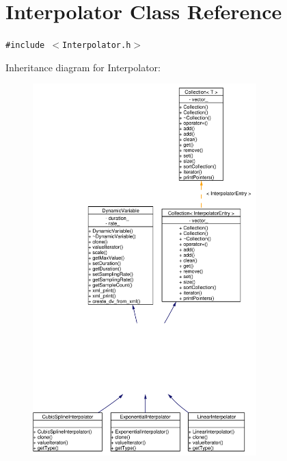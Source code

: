 \hypertarget{classInterpolator}{
\section{Interpolator Class Reference}
\label{classInterpolator}
}
{\tt \#include $<$Interpolator.h$>$}

Inheritance diagram for Interpolator:\begin{figure}[H]
\begin{center}
\leavevmode
\includegraphics[width=245pt]{classInterpolator__inherit__graph}
\end{center}
\end{figure}

